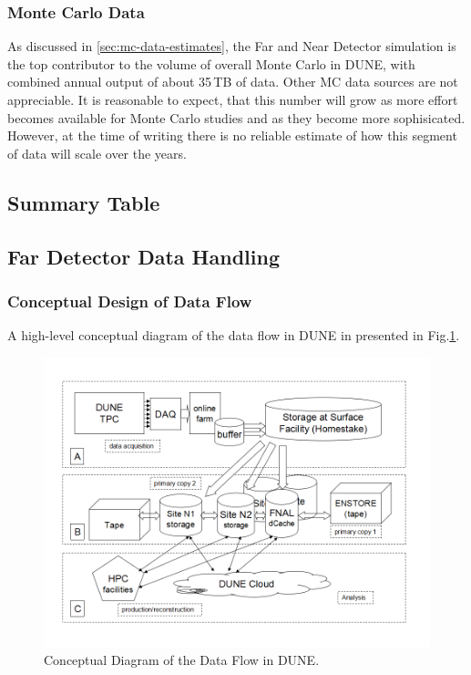 
\subsubsection{Monte Carlo Data}
As discussed in \ref{sec:mc-data-estimates}, the Far and Near Detector simulation is the top contributor to the volume of overall
Monte Carlo in DUNE, with combined annual output of about 35\,TB of data. Other MC data sources are not appreciable.
It is reasonable to expect, that this number will grow as more effort becomes available for Monte Carlo studies and
as they become more sophisicated. However, at the time of writing there is no reliable estimate of how this segment of data
will scale over the years.


\subsection{Summary Table}

\subsection{Far Detector Data Handling}
\subsubsection{Conceptual Design of Data Flow}
A high-level conceptual diagram of the data flow in DUNE in presented in Fig.\ref{fig:DUNEdataflow}.
\begin{figure}[h!]
\centering
\includegraphics[width=\textwidth]{DUNEdataflow.png}
\caption{Conceptual Diagram of the Data Flow in DUNE.}
\label{fig:DUNEdataflow}
\end{figure}

